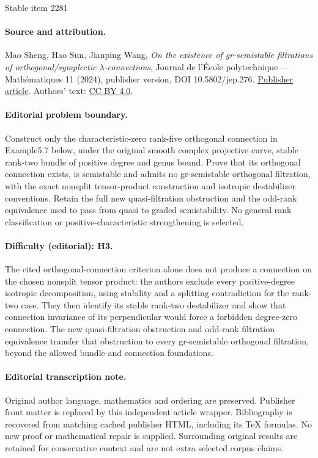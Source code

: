 \documentclass[11pt]{article}
\numberwithin{equation}{section}
\theoremstyle{plain}
\theoremstyle{definition}
\begin{document}
\begin{center}{\Large Stable item 2281}\end{center}
\paragraph{Source and attribution.}
Mao Sheng, Hao Sun, Jianping Wang, \emph{On the existence of gr-semistable filtrations of orthogonal/symplectic $\lambda $-connections}, Journal de l’École polytechnique — Mathématiques 11 (2024), publisher version, DOI 10.5802/jep.276. \href{https://jep.centre-mersenne.org/articles/10.5802/jep.276/}{Publisher article}. Authors' text: \href{https://creativecommons.org/licenses/by/4.0/}{CC BY 4.0}.
\paragraph{Editorial problem boundary.}
Construct only the characteristic-zero rank-five orthogonal connection in Example5.7 below, under the original smooth complex projective curve, stable rank-two bundle of positive degree and genus bound. Prove that its orthogonal connection exists, is semistable and admits no gr-semistable orthogonal filtration, with the exact nonsplit tensor-product construction and isotropic destabilizer conventions. Retain the full new quasi-filtration obstruction and the odd-rank equivalence used to pass from quasi to graded semistability. No general rank classification or positive-characteristic strengthening is selected.
\paragraph{Difficulty (editorial): H3.}
The cited orthogonal-connection criterion alone does not produce a connection on the chosen nonsplit tensor product: the authors exclude every positive-degree isotropic decomposition, using stability and a splitting contradiction for the rank-two case. They then identify its stable rank-two destabilizer and show that connection invariance of its perpendicular would force a forbidden degree-zero connection. The new quasi-filtration obstruction and odd-rank filtration equivalence transfer that obstruction to every gr-semistable orthogonal filtration, beyond the allowed bundle and connection foundations.
\paragraph{Editorial transcription note.}
Original author language, mathematics and ordering are preserved. Publisher front matter is replaced by this independent article wrapper. Bibliography is recovered from matching cached publisher HTML, including its TeX formulas. No new proof or mathematical repair is supplied. Surrounding original results are retained for conservative context and are not extra selected corpus claims.
\clearpage
\end{document}
